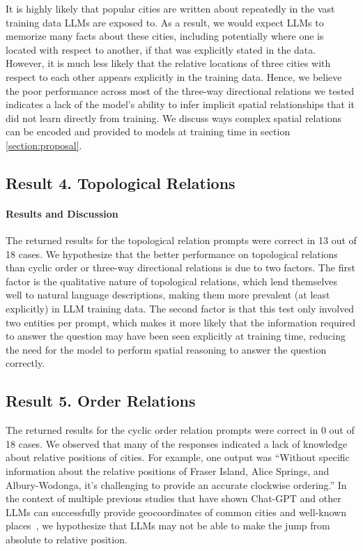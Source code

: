 It is highly likely that popular cities are written about repeatedly in the vast training data LLMs are exposed to.
As a result, we would expect LLMs to memorize many facts about these cities, including potentially where one is located with respect to another, if that was explicitly stated in the data.
However, it is much less likely that the relative locations of three cities with respect to each other appears explicitly in the training data.
Hence, we believe the poor performance across most of the three-way directional relations we tested indicates a lack of the model's ability to infer implicit spatial relationships that it did not learn directly from training.
We discuss ways complex spatial relations can be encoded and provided to models at training time in section \ref{section:proposal}.



\subsection{Result 4. Topological Relations}
\paragraph{Results and Discussion}
The returned results for the topological relation prompts were correct in 13 out of 18 cases.
We hypothesize that the better performance on topological relations than cyclic order or three-way directional relations is due to two factors.
The first factor is the qualitative nature of topological relations, which lend themselves well to natural language descriptions, making them more prevalent (at least explicitly) in LLM training data.
The second factor is that this test only involved two entities per prompt, which makes it more likely that the information required to answer the question may have been seen explicitly at training time, reducing the need for the model to perform spatial reasoning to answer the question correctly.



\subsection{Result 5. Order Relations}
The returned results for the cyclic order relation prompts were correct in 0 out of 18 cases.
We observed that many of the responses indicated a lack of knowledge about relative positions of cities.
For example, one output was 
``Without specific information about the relative positions of Fraser Island, Alice Springs, and Albury-Wodonga, it's challenging to provide an accurate clockwise ordering.''
In the context of multiple previous studies that have shown Chat-GPT and other LLMs can successfully provide geocoordinates of common cities and well-known places~\cite{Bhandari2023,Qi2023}, we hypothesize that LLMs may not be able to make the jump from absolute to relative position. 










